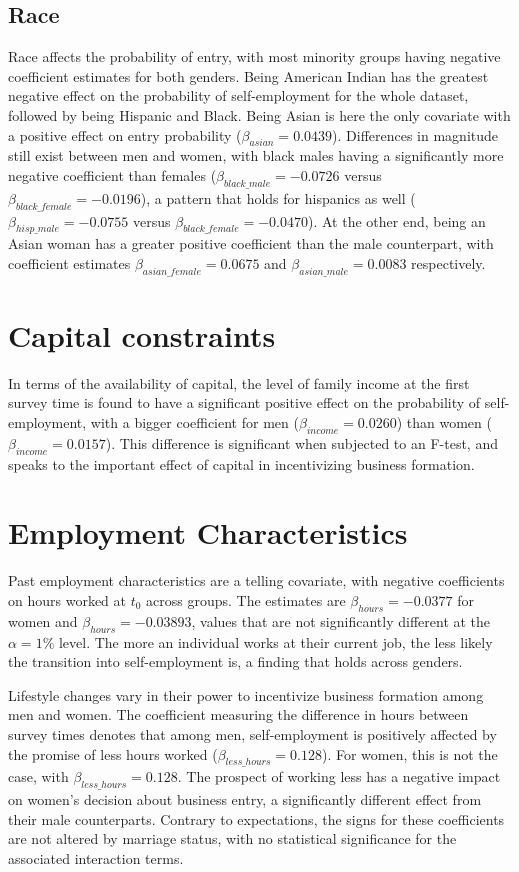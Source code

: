 \subsection{Race}

Race affects the probability of entry, with most minority groups having negative coefficient estimates for both genders. Being American Indian has the greatest negative effect on the probability of self-employment for the whole dataset, followed by being Hispanic and Black. Being Asian is here the only covariate with a positive effect on entry probability ($\beta_{asian} = 0.0439$). Differences in magnitude still exist between men and women, with black males having a significantly more negative coefficient than females ($\beta_{black\_male} = -0.0726$ versus $\beta_{black\_female} = -0.0196$), a pattern that holds for hispanics as well ($\beta_{hisp\_male} = -0.0755$ versus $\beta_{black\_female} = -0.0470$). At the other end, being an Asian woman has a greater positive coefficient than the male counterpart, with coefficient estimates $\beta_{asian\_female} = 0.0675$ and $\beta_{asian\_male} = 0.0083$ respectively. 

\section{Capital constraints}

In terms of the availability of capital, the level of family income at the first survey time is found to have a significant positive effect on the probability of self-employment, with a bigger coefficient for men ($\beta_{income} = 0.0260$) than women ($\beta_{income} = 0.0157$). This difference is significant when subjected to an F-test, and speaks to the important effect of capital in incentivizing business formation.

\section{Employment Characteristics}

Past employment characteristics are a telling covariate, with negative coefficients on hours worked at $t_0$ across groups. The estimates are $\beta_{hours} = -0.0377$ for women and $\beta_{hours} = -0.03893$, values that are not significantly different at the $\alpha = 1 \%$ level. The more an individual works at their current job, the less likely the transition into self-employment is, a finding that holds across genders.

Lifestyle changes vary in their power to incentivize business formation among men and women. The coefficient measuring the difference in hours between survey times denotes that among men, self-employment is positively affected by the promise of less hours worked ($\beta_{less\_hours} = 0.128$). For women, this is not the case, with $\beta_{less\_hours} = 0.128$. The prospect of working less has a negative impact on women's decision about business entry, a significantly different effect from their male counterparts. Contrary to expectations, the signs for these coefficients are not altered by marriage status, with no statistical significance for the associated interaction terms. 

